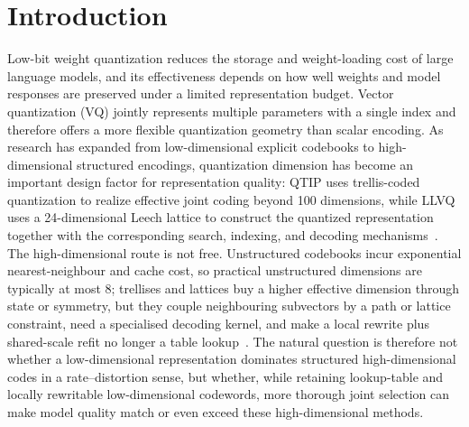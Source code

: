 \section{Introduction}

Low-bit weight quantization reduces the storage and weight-loading cost of large language models, and its effectiveness depends on how well weights and model responses are preserved under a limited representation budget.
Vector quantization (VQ) jointly represents multiple parameters with a single index and therefore offers a more flexible quantization geometry than scalar encoding.
As research has expanded from low-dimensional explicit codebooks to high-dimensional structured encodings, quantization dimension has become an important design factor for representation quality: QTIP uses trellis-coded quantization to realize effective joint coding beyond 100 dimensions, while LLVQ uses a 24-dimensional Leech lattice to construct the quantized representation together with the corresponding search, indexing, and decoding mechanisms~\cite{qtip,llvq}.
The high-dimensional route is not free. Unstructured codebooks incur exponential nearest-neighbour and cache cost, so practical unstructured dimensions are typically at most 8; trellises and lattices buy a higher effective dimension through state or symmetry, but they couple neighbouring subvectors by a path or lattice constraint, need a specialised decoding kernel, and make a local rewrite plus shared-scale refit no longer a table lookup~\cite{qtip,quipsharp,aqlm,llvq}.
The natural question is therefore not whether a low-dimensional representation dominates structured high-dimensional codes in a rate--distortion sense, but whether, while retaining lookup-table and locally rewritable low-dimensional codewords, more thorough joint selection can make model quality match or even exceed these high-dimensional methods.

